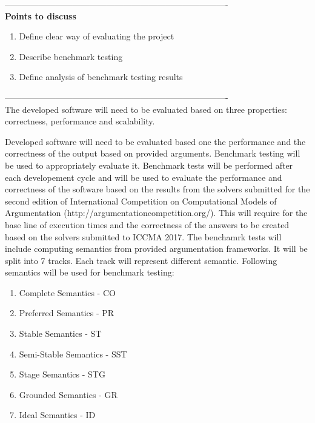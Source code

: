 
-------------------------------------------------------------------------------\\
\textbf{Points to discuss}
\begin{enumerate}
	\item{Define clear way of evaluating the project}
	\item{Describe benchmark testing}
	\item{Define analysis of benchmark testing results}
\end{enumerate}
-------------------------------------------------------------------------------\\

The developed software will need to be evaluated based on three properties: correctness, performance and scalability. 

Developed software will need to be evaluated based one the performance and the correctness of the output based on provided arguments. Benchmark testing will be used to appropriately evaluate it. Benchmark tests will be performed after each developement cycle and will be used to evaluate the performance and correctness of the software based on the results from the solvers submitted for the second edition of International Competition on Computational Models of Argumentation (http://argumentationcompetition.org/). This will require for the base line of execution times and the correctness of the answers to be created based on the solvers submitted to ICCMA 2017.
The benchamrk tests will include computing semantics from provided argumentation frameworks. It will be split into 7 tracks. Each track will represent different semantic. Following semantics will be used for benchmark testing:
\begin{enumerate}
	\item{Complete Semantics - CO}
	\item{Preferred Semantics - PR}
	\item{Stable Semantics - ST}
	\item{Semi-Stable Semantics - SST}
	\item{Stage Semantics - STG}
	\item{Grounded Semantics - GR}
	\item{Ideal Semantics - ID}
\end{enumerate}

